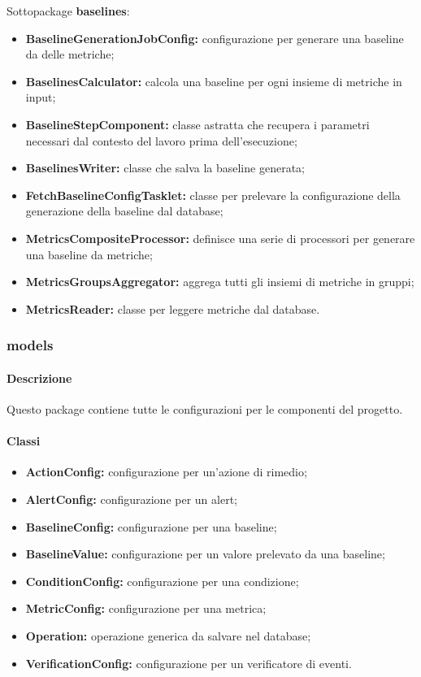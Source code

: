		Sottopackage \textbf{baselines}:
		\begin{itemize}
			\item \textbf{BaselineGenerationJobConfig:} configurazione per generare una baseline da delle metriche;
			\item \textbf{BaselinesCalculator:} calcola una baseline per ogni insieme di metriche in input;
			\item \textbf{BaselineStepComponent:} classe astratta che recupera i parametri necessari dal contesto 
				del lavoro prima dell'esecuzione;
			\item \textbf{BaselinesWriter:} classe che salva la baseline generata;
			\item \textbf{FetchBaselineConfigTasklet:} classe per prelevare la configurazione della generazione
				della baseline dal database;
			\item \textbf{MetricsCompositeProcessor:} definisce una serie di processori per generare una baseline
				da metriche;
			\item \textbf{MetricsGroupsAggregator:} aggrega tutti gli insiemi di metriche in gruppi;
			\item \textbf{MetricsReader:} classe per leggere metriche dal database.
		\end{itemize}

\newpage

	\subsubsection{models}
		
		\paragraph*{Descrizione}
			Questo package contiene tutte le configurazioni per le componenti del progetto.		
		
		\paragraph*{Classi}
		
		\begin{itemize}
			\item \textbf{ActionConfig:} configurazione per un'azione di rimedio;
			\item \textbf{AlertConfig:} configurazione per un alert;
			\item \textbf{BaselineConfig:} configurazione per una baseline;
			\item \textbf{BaselineValue:} configurazione per un valore prelevato da una baseline;
			\item \textbf{ConditionConfig:} configurazione per una condizione;
			\item \textbf{MetricConfig:} configurazione per una metrica;
			\item \textbf{Operation:} operazione generica da salvare nel database;
			\item \textbf{VerificationConfig:} configurazione per un verificatore di eventi.
		\end{itemize}
		

